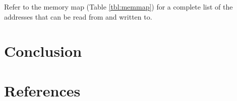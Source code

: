 \documentclass{article}
\begin{document}
Refer to the memory map (Table \ref{tbl:memmap}) for
a complete list of the addresses that can be read from and written
to.


\section{Conclusion}


\clearpage

\pagebreak
\renewcommand*{\refname}{\vspace{-8mm}}
\section{References}
%


\end{document}
